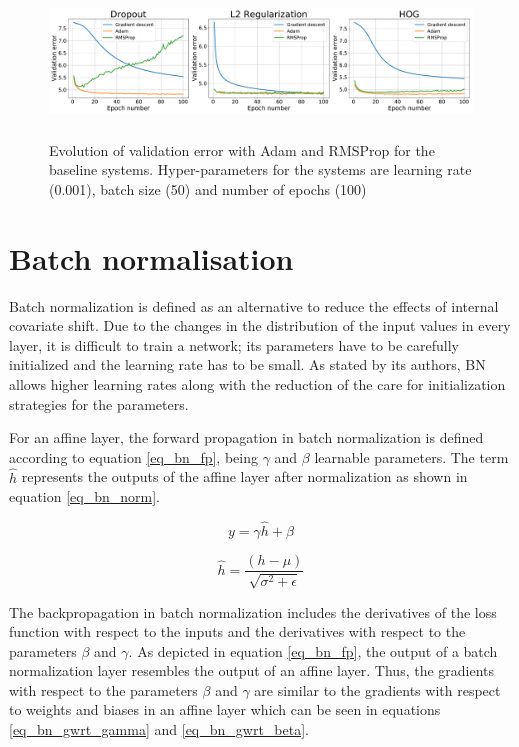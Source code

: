 \documentclass{article}
\begin{document}
\begin{figure}[tb]
\vskip 5mm
\begin{center}
\includegraphics[width=\textwidth,height=4cm]{exp1_metrics}
\caption{Evolution of validation error with Adam and RMSProp for the baseline systems. Hyper-parameters for the systems are learning rate (0.001), batch size (50) and number of epochs (100)}
\label{fig:fg_lr}
\end{center}
\vskip -5mm
\end{figure}

\section{Batch normalisation}
Batch normalization is defined as an alternative to reduce the effects of internal covariate shift. Due to the changes in the distribution of the input values in every layer, it is difficult to train a network; its parameters have to be carefully initialized and the learning rate has to be small. As stated by its authors, BN allows higher learning rates along with the reduction of the care for initialization strategies for the parameters.  
 
For an affine layer, the forward propagation in batch normalization is defined according to equation \ref{eq_bn_fp}, being $\gamma$ and $\beta$ learnable parameters. The term $\hat{h}$ represents the outputs of the affine layer after normalization as shown in equation \ref{eq_bn_norm}.

\begin{equation}
	y = \gamma \hat{h} + \beta
	\label{eq_bn_fp}
\end{equation}

\begin{equation}
	\hat{h} = \frac{(h - \mu)}{\sqrt{\sigma^2 + \epsilon}}
	\label{eq_bn_norm}
\end{equation}

The backpropagation in batch normalization includes the derivatives of the loss function with respect to the inputs and the derivatives with respect to the parameters $\beta$ and $\gamma$. As depicted in equation \ref{eq_bn_fp}, the output of a batch normalization layer resembles the output of an affine layer. Thus, the gradients with respect to the parameters $\beta$ and $\gamma$ are similar to the gradients with respect to weights and biases in an affine layer which can be seen in equations \ref{eq_bn_gwrt_gamma} and \ref{eq_bn_gwrt_beta}.
\end{document}
